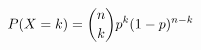 \documentclass[preview]{standalone}
\begin{document}
\begin{align*}
\special{dvisvgm:raw <g id='unique000'>}P(X=k) = \binom{n}{k} p^k (1-p)^{n-k}\special{dvisvgm:raw </g>}
\end{align*}
\end{document}
